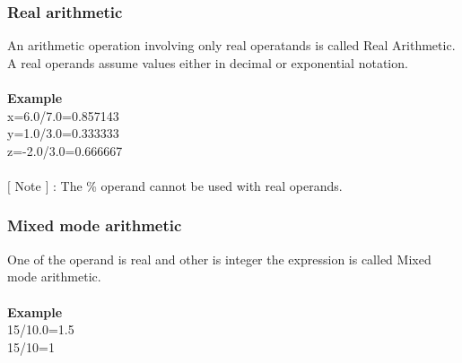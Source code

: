 \documentclass{article}
\begin{document}
	\subsubsection{Real arithmetic}
	An arithmetic operation involving only real operatands is called Real Arithmetic. \\
	A real operands assume values either in decimal or exponential notation.
	\\ \\
	\textbf{Example} \\
	x=6.0/7.0=0.857143 \\ y=1.0/3.0=0.333333 \\ z=-2.0/3.0=0.666667
	\\ \\
	$[$ Note $]$ : The \% operand cannot be used with real operands.
	
	\subsubsection{Mixed mode arithmetic}
	One of the operand is real and other is integer the expression is called Mixed mode arithmetic.
	\\ \\
	\textbf{Example} \\
	15/10.0=1.5 \\ 15/10=1
	
\end{document}

